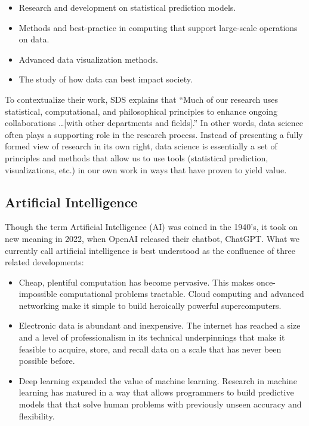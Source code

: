 \documentclass[12pt, oneside]{article}   	%
\begin{document}
\begin{itemize}
\item Research and development on statistical prediction models.
\item Methods and best-practice in computing that support large-scale operations on data.
\item Advanced data visualization methods.
\item The study of how data can best impact society.
\end{itemize}

To contextualize their work, SDS explains that “Much of our research uses statistical, computational, and philosophical principles to enhance ongoing collaborations …[with other departments and fields].”  In other words, data science often plays a supporting role in the research process.  Instead of presenting a fully formed view of research in its own right, data science is essentially a set of principles and methods that allow us to use tools (statistical prediction, visualizations, etc.) in our own work in ways that have proven to yield value.


\subsection{Artificial Intelligence}\label{section.definitions.artificial-intelligence}
Though the term Artificial Intelligence (AI) was coined in the 1940’s, it took on new meaning in 2022, when OpenAI released their chatbot, ChatGPT.  What we currently call artificial intelligence is best understood as the confluence of three related developments:

\begin{itemize}
\item Cheap, plentiful computation has become pervasive.  This makes once-impossible computational problems tractable. Cloud computing and advanced networking make it simple to build heroically powerful supercomputers.
\item Electronic data is abundant and inexpensive.  The internet has reached a size and a level of professionalism in its technical underpinnings that make it feasible to acquire, store, and recall data on a scale that has never been possible before.
\item Deep learning expanded the value of machine learning. Research in machine learning has matured in a way that allows programmers to build predictive models that that solve human problems with previously unseen accuracy and flexibility.   
\end{itemize}
\end{document}
